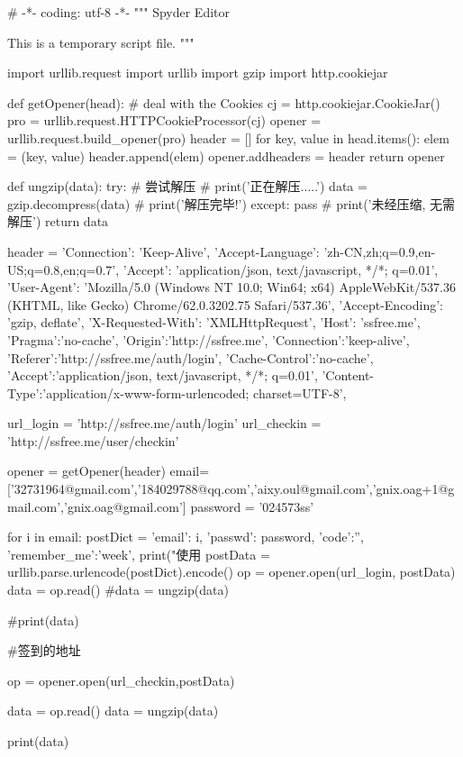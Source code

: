 # -*- coding: utf-8 -*-
"""
Spyder Editor

This is a temporary script file.
"""

import urllib.request
import urllib
import gzip
import http.cookiejar


def getOpener(head):
    # deal with the Cookies
    cj = http.cookiejar.CookieJar()
    pro = urllib.request.HTTPCookieProcessor(cj)
    opener = urllib.request.build_opener(pro)
    header = []
    for key, value in head.items():
        elem = (key, value)
        header.append(elem)
    opener.addheaders = header
    return opener

def ungzip(data):
    try:        # 尝试解压
      #  print('正在解压.....')
        data = gzip.decompress(data)
      #  print('解压完毕!')
    except:
       pass # print('未经压缩, 无需解压')
    return data


header = {
    'Connection': 'Keep-Alive',
    'Accept-Language': 'zh-CN,zh;q=0.9,en-US;q=0.8,en;q=0.7',
    'Accept': 'application/json, text/javascript, */*; q=0.01',
    'User-Agent': 'Mozilla/5.0 (Windows NT 10.0; Win64; x64) AppleWebKit/537.36 (KHTML, like Gecko) Chrome/62.0.3202.75 Safari/537.36',
    'Accept-Encoding': 'gzip, deflate',
    'X-Requested-With': 'XMLHttpRequest',
    'Host': 'ssfree.me',
    'Pragma':'no-cache',
    'Origin':'http://ssfree.me',
    'Connection':'keep-alive',
    'Referer':'http://ssfree.me/auth/login',
    'Cache-Control':'no-cache',
    'Accept':'application/json, text/javascript, */*; q=0.01',
    'Content-Type':'application/x-www-form-urlencoded; charset=UTF-8',
}


url_login = 'http://ssfree.me/auth/login'
url_checkin = 'http://ssfree.me/user/checkin'

opener = getOpener(header)
email=['32731964@gmail.com','184029788@qq.com','aixy.oul@gmail.com','gnix.oag+1@gmail.com','gnix.oag@gmail.com']
password = '024573ss'

for i in email:
    postDict = {
        'email': i,
        'passwd': password,
        'code':'',
        'remember_me':'week',
    }
    print("使用%
    postData = urllib.parse.urlencode(postDict).encode()
    op = opener.open(url_login, postData)
    data = op.read()
    #data = ungzip(data)

    #print(data)

    #签到的地址

    op = opener.open(url_checkin,postData)

    data = op.read()
    data = ungzip(data)

    print(data)